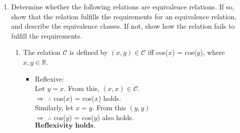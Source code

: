 \documentclass{article}
\newcommand{\R}{\mathbb{R}}
\begin{document}
\begin{enumerate}
\begin{multicols}{2}
\begin{enumerate}
    \columnbreak
    
    \item $A$ is related to $B$ if $A \subset B$. Note 
        that this notation means proper subset.
        \begin{enumerate}
            \item Since every element of a set $A$ is contained in itself, $A \sim A$ $\forall A$
            and it makes the relation $\textbf{reflexive}$\\
            \item Let $A \sim B$ and $B \sim A$. Here as per definition, every element of $A \subseteq B$ 
            and  $B \subseteq A$ also however $A \neq B$. \\$\therefore$ The relation is $\textbf{antisymmetric}$.\\
            \item  Let $A \sim B$ and $B \sim C$, then it means that $A \subseteq  B$ and $B \subseteq C$. That automatically puts 
            every element of A inside C. So $A \sim C$ and hence the relation is $\textbf{transitive}$.\\
        \end{enumerate}
        In short, the relation is :
    \begin{itemize}
        \item $\textbf{reflexive}$
        \item $\textbf{antisymmetric}$
        \item $\textbf{transitive}$
    \end{itemize}
    \end{enumerate}
\end{multicols}

\pagebreak %

\item Determine whether the following relations are equivalence relations. 
If so, show that the relation fulfills the requirements for an equivalence relation, 
and describe the equivalence classes. If not, show how the relation fails to fulfill 
the requirements.
\begin{enumerate}
    \item The relation $\mathcal{C}$ is defined by $(x,y)\in \mathcal{C}$ iff cos($x$) = cos($y$), 
    where $x,y \in \R$.
    \begin{itemize}
        \item Reflexive:\\ Let $y = x$. From this, $(x,x) \in \mathcal{C}$.\\ 
        $\Rightarrow$ $\therefore$ cos($x$) = cos($x$) holds.\\
        Similarly, let $x = y$. From this $(y,y)$\\ 
        $\Rightarrow$ $\therefore$ cos($y$) = cos($y$) also holds.\\$\textbf{Reflexivity holds.}$\\


\end{itemize}
\end{enumerate}
\end{enumerate}
\end{document}
